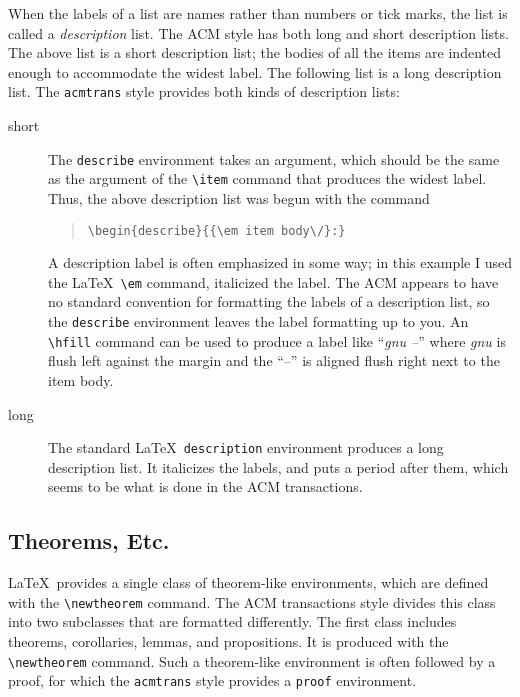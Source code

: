 \documentclass[acmtocl]{acmtrans2m}
\begin{document}
When the labels of a list are names rather than numbers or tick marks,
the list is called a {\em description\/} list.
The ACM style
has both long and short description lists.  The above list is a short
description list; the bodies of all the items are indented enough to
accommodate the widest label.
The following list is a long description list.
The {\tt acmtrans} style provides both kinds of description lists:
\begin{description}
\item[short]
The {\tt describe} environment 
takes an argument, which should be the same as the argument of the 
\verb|\item|
command that produces the widest label.  Thus, the above description
list was begun with the command
\begin{quote}
\begin{verbatim}
\begin{describe}{{\em item body\/}:}
\end{verbatim}
\end{quote}

A description label is often emphasized in some way; in this example I
used the \LaTeX\ \verb|\em| command, italicized the label.  The ACM
appears to have no standard convention for formatting the labels of a
description list, so the {\tt describe} environment leaves the label
formatting up to you.  An \verb|\hfill| command can be used to produce
a label like ``{\em gnu \hfill --\/}'' where {\em gnu\/} is flush left
against the margin and the ``--'' is aligned flush right next to the
item body.

\item[long]
The standard \LaTeX\ {\tt description} environment produces a long
description list.  It italicizes the labels, and puts a period after
them, which seems to be what is done in the ACM transactions.
\end{description}

\subsection{Theorems, Etc.}


\LaTeX\ provides a single class of theorem-like environments, which 
are
defined with the \verb|\newtheorem| command.  
The ACM transactions
style divides this class into two subclasses that are formatted
differently.  The first class includes theorems, corollaries, lemmas,
and propositions.  It is produced with the \verb|\newtheorem| command.
Such a theorem-like environment is often followed by a proof, for 
which
the {\tt acmtrans} style provides a {\tt proof} environment.
\end{document}
